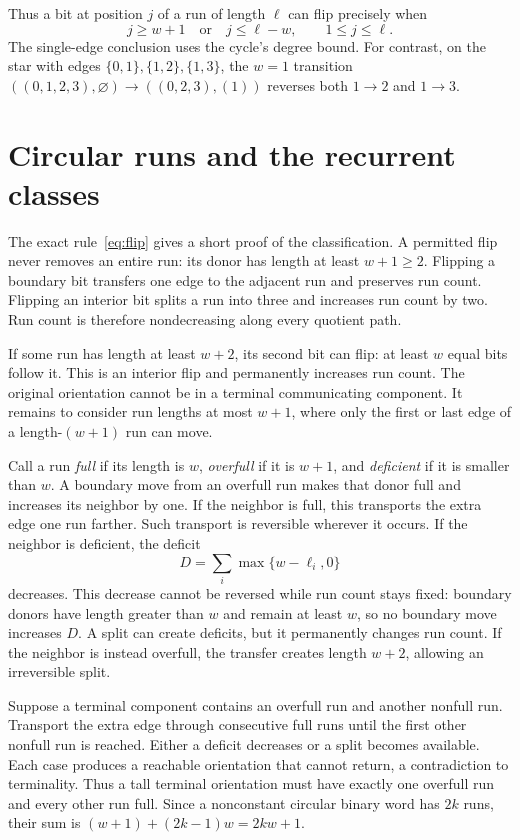 \documentclass[11pt]{article}
\theoremstyle{remark}
\newcommand{\emptyq}{\varnothing}
\begin{document}
Thus a bit at position $j$ of a run of length $\ell$ can flip precisely when
\begin{equation}\label{eq:flip}
 j\ge w+1\quad\text{or}\quad j\le\ell-w,\qquad 1\le j\le\ell.
\end{equation}
The single-edge conclusion uses the cycle's degree bound. For contrast, on the star with edges $\{0,1\},\{1,2\},\{1,3\}$, the $w=1$ transition $((0,1,2,3),\emptyq)\to((0,2,3),(1))$ reverses both $1\to2$ and $1\to3$.

\section{Circular runs and the recurrent classes}\label{sec:runs}
The exact rule~\eqref{eq:flip} gives a short proof of the classification. A permitted flip never removes an entire run: its donor has length at least $w+1\ge2$. Flipping a boundary bit transfers one edge to the adjacent run and preserves run count. Flipping an interior bit splits a run into three and increases run count by two. Run count is therefore nondecreasing along every quotient path.

If some run has length at least $w+2$, its second bit can flip: at least $w$ equal bits follow it. This is an interior flip and permanently increases run count. The original orientation cannot be in a terminal communicating component. It remains to consider run lengths at most $w+1$, where only the first or last edge of a length-$(w+1)$ run can move.

Call a run \emph{full} if its length is $w$, \emph{overfull} if it is $w+1$, and \emph{deficient} if it is smaller than $w$. A boundary move from an overfull run makes that donor full and increases its neighbor by one. If the neighbor is full, this transports the extra edge one run farther. Such transport is reversible wherever it occurs. If the neighbor is deficient, the deficit
\[
 D=\sum_i\max\{w-\ell_i,0\}
\]
decreases. This decrease cannot be reversed while run count stays fixed: boundary donors have length greater than $w$ and remain at least $w$, so no boundary move increases $D$. A split can create deficits, but it permanently changes run count. If the neighbor is instead overfull, the transfer creates length $w+2$, allowing an irreversible split.

Suppose a terminal component contains an overfull run and another nonfull run. Transport the extra edge through consecutive full runs until the first other nonfull run is reached. Either a deficit decreases or a split becomes available. Each case produces a reachable orientation that cannot return, a contradiction to terminality. Thus a tall terminal orientation must have exactly one overfull run and every other run full. Since a nonconstant circular binary word has $2k$ runs, their sum is $(w+1)+(2k-1)w=2kw+1$.
\end{document}
